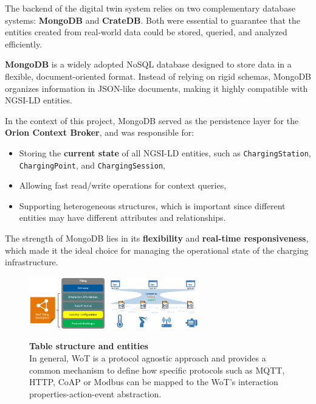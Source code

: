 The backend of the digital twin system relies on two complementary database systems: \textbf{MongoDB} and \textbf{CrateDB}.  
Both were essential to guarantee that the entities created from real-world data could be stored, queried, and analyzed efficiently.


\textbf{MongoDB} is a widely adopted NoSQL database designed to store data in a flexible, document-oriented format.  
Instead of relying on rigid schemas, MongoDB organizes information in JSON-like documents, making it highly compatible with NGSI-LD entities.  

In the context of this project, MongoDB served as the persistence layer for the \textbf{Orion Context Broker}, and was responsible for:
\begin{itemize}
    \item Storing the \textbf{current state} of all NGSI-LD entities, such as \texttt{ChargingStation}, \texttt{ChargingPoint}, and \texttt{ChargingSession},
    \item Allowing fast read/write operations for context queries,
    \item Supporting heterogeneous structures, which is important since different entities may have different attributes and relationships.
\end{itemize}

The strength of MongoDB lies in its \textbf{flexibility} and \textbf{real-time responsiveness}, which made it the ideal choice for managing the operational state of the charging infrastructure.


\begin{figure}[ht]
    \centering
    \includegraphics[width=0.3\textwidth]{Images/td.png}
    \includegraphics[width=0.35\textwidth]{Images/wot-mappings.png}
    \caption{\textbf{Table structure and entities} \\In general, WoT is a protocol agnostic approach and provides a common mechanism to define how specific protocols such as MQTT, HTTP, CoAP or Modbus can be mapped to the WoT's interaction properties-action-event abstraction.~\cite{W3CWOT2020}}
    \label{fig:image2}
\end{figure}



